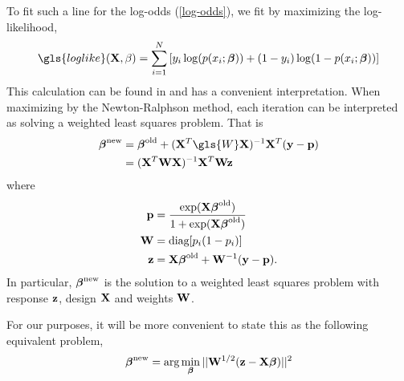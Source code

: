 \documentclass[main.tex]{subfiles}
\begin{document}
To fit such a line for the log-odds (\ref{log-odds}), we fit by maximizing the log-likelihood,
\begin{align}
	\gls{loglike}(\X, \beta) = \sum_{i = 1}^N \left [ y_i \log (p(x_i; \bbeta)) + (1-y_i) \log(1 - p(x_i; \bbeta))\right ] \label{loglikelihood}
\end{align}
This calculation can be found in \citep{ESL} and has a convenient interpretation. When maximizing by the Newton-Ralphson method, each iteration can be interpreted as solving a weighted least squares problem. That is
\begin{align}
    \bbeta^{\new} &= \bbeta^{\old} + (\X^T \gls{W} \X)^{-1} \X^T(\y - \p) \\
    &= (\X^T \W \X)^{-1} \X^T \W \z
\end{align}
where
\begin{align}
	\mathbf{p} &= \dfrac{\text{exp}(\mathbf{X} \boldsymbol \beta^{\text{old}})}{1 + \text{exp}(\mathbf{X} \boldsymbol \beta^{\text{old}})} \label{pdef}\\
    \mathbf{W} &= \text{diag}[p_i(1-p_i)] \label{Wdef}\\
    \mathbf{z} &= \mathbf{X} \boldsymbol \beta^{\text{old}} + \mathbf{W}^{-1}(\mathbf{y} - \mathbf{p}). \label{zdef}
\end{align}
In particular, $\boldsymbol \beta^{\text{new}}$ is the solution to a weighted least squares problem with response $\mathbf{z}$, design $\mathbf{X}$ and weights $\mathbf{W}$.

For our purposes, it will be more convenient to state this as the following equivalent problem,
\begin{align}
    \boldsymbol \beta^{\text{new}} =  \text{arg} \min_{\boldsymbol \beta} ||\mathbf{W}^{1/2}(\mathbf{z} - \mathbf{X} \boldsymbol \beta)||^2
\end{align}
\end{document}
